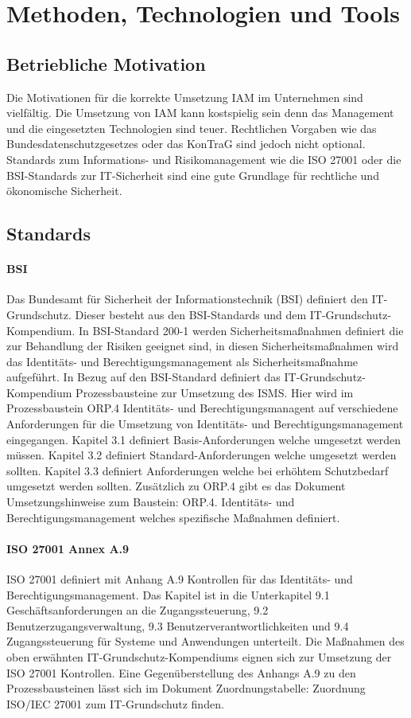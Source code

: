 \documentclass[10pt]{article}
\begin{document}
\section{Methoden, Technologien und Tools}
\label{sec:existing}
\subsection{Betriebliche Motivation}
Die Motivationen für die korrekte Umsetzung IAM im Unternehmen sind vielfältig. Die Umsetzung von IAM kann kostspielig sein denn das Management und die eingesetzten Technologien sind teuer. Rechtlichen Vorgaben wie das Bundesdatenschutzgesetzes oder das KonTraG sind jedoch nicht optional. Standards zum Informations- und Risikomanagement wie die ISO 27001 oder die BSI-Standards zur IT-Sicherheit sind eine gute Grundlage für rechtliche und ökonomische Sicherheit.~\cite{tsolkas2017}
\subsection{Standards}
\paragraph{BSI}
Das Bundesamt für Sicherheit der Informationstechnik (BSI) definiert den IT-Grundschutz. Dieser besteht aus den BSI-Standards und dem IT-Grundschutz-Kompendium. In BSI-Standard 200-1 werden Sicherheitsmaßnahmen definiert die zur Behandlung der Risiken geeignet sind, in diesen Sicherheitsmaßnahmen wird das Identitäts- und Berechtigungsmanagement als Sicherheitsmaßnahme aufgeführt. In Bezug auf den BSI-Standard definiert das IT-Grundschutz-Kompendium Prozessbausteine zur Umsetzung des ISMS. Hier wird im Prozessbaustein \glqq{}ORP.4 Identitäts- und Berechtigungsmanagent\grqq{} auf verschiedene Anforderungen für die Umsetzung von Identitäts- und Berechtigungsmanagement eingegangen. Kapitel 3.1 definiert Basis-Anforderungen welche umgesetzt werden müssen. Kapitel 3.2 definiert Standard-Anforderungen welche umgesetzt werden sollten. Kapitel 3.3 definiert Anforderungen welche bei erhöhtem Schutzbedarf umgesetzt werden sollten. Zusätzlich zu ORP.4 gibt es das Dokument \glqq{}Umsetzungshinweise zum Baustein: ORP.4. Identitäts- und Berechtigungsmanagement\grqq{} welches spezifische Maßnahmen definiert.~\cite{orp4}
\paragraph{ISO 27001 Annex A.9}
ISO 27001 definiert mit Anhang A.9 Kontrollen für das Identitäts- und Berechtigungsmanagement. Das Kapitel ist in die Unterkapitel \glqq{}9.1 Geschäftsanforderungen an die Zugangssteuerung\grqq{}, \glqq{}9.2 Benutzerzugangsverwaltung\grqq{}, \glqq{}9.3 Benutzerverantwortlichkeiten\grqq{} und \glqq{}9.4 Zugangssteuerung für Systeme und Anwendungen\grqq{} unterteilt. Die Maßnahmen des oben erwähnten IT-Grundschutz-Kompendiums eignen sich zur Umsetzung der ISO 27001 Kontrollen. Eine Gegenüberstellung des Anhangs A.9 zu den Prozessbausteinen lässt sich im Dokument \glqq{}Zuordnungstabelle: Zuordnung ISO/IEC 27001 zum IT-Grundschutz\grqq{} finden.
\end{document}
